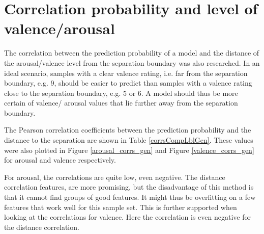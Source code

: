 
\section{Correlation probability and level of valence/arousal}

The correlation between the prediction probability of a model and the distance of the arousal/valence level from the separation boundary was also researched. In an ideal scenario, samples with a clear valence rating, i.e. far from the separation boundary, e.g. 9, should be easier to predict than samples with a valence rating close to the separation boundary, e.g. 5 or 6. A model should thus be more certain of valence/ arousal values that lie further away from the separation boundary.

\npar

The Pearson correlation coefficients between the prediction probability and the distance to the separation are shown in Table \ref{corrsCompLblGen}. These values were also plotted in Figure \ref{arousal_corrs_gen} and Figure \ref{valence_corrs_gen} for arousal and valence respectively.

\npar

For arousal, the correlations are quite low, even negative. The distance correlation features, are more promising, but the disadvantage of this method is that it cannot find groups of good features. It might thus be overfitting on a few features that work well for this sample set. This is further supported when looking at the correlations for valence. Here the correlation is even negative for the distance correlation.

